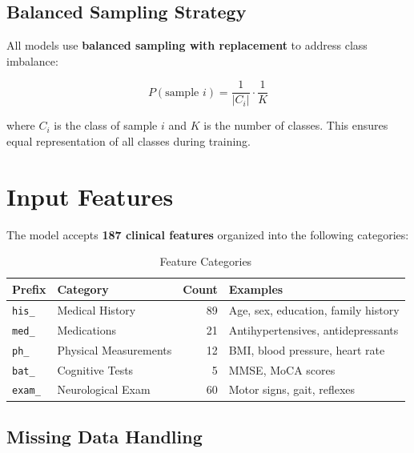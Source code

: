 \documentclass[11pt,a4paper]{article}
\begin{document}
\subsection{Balanced Sampling Strategy}

All models use \textbf{balanced sampling with replacement} to address class imbalance:

\begin{equation}
P(\text{sample } i) = \frac{1}{|C_i|} \cdot \frac{1}{K}
\end{equation}

where $C_i$ is the class of sample $i$ and $K$ is the number of classes. This ensures equal representation of all classes during training.

\section{Input Features}

The model accepts \textbf{187 clinical features} organized into the following categories:

\begin{table}[H]
\centering
\caption{Feature Categories}
\label{tab:features}
\begin{tabular}{@{}llrl@{}}
\toprule
\textbf{Prefix} & \textbf{Category} & \textbf{Count} & \textbf{Examples} \\
\midrule
\texttt{his\_} & Medical History & 89 & Age, sex, education, family history \\
\texttt{med\_} & Medications & 21 & Antihypertensives, antidepressants \\
\texttt{ph\_} & Physical Measurements & 12 & BMI, blood pressure, heart rate \\
\texttt{bat\_} & Cognitive Tests & 5 & MMSE, MoCA scores \\
\texttt{exam\_} & Neurological Exam & 60 & Motor signs, gait, reflexes \\
\bottomrule
\end{tabular}
\end{table}

\subsection{Missing Data Handling}
\end{document}
